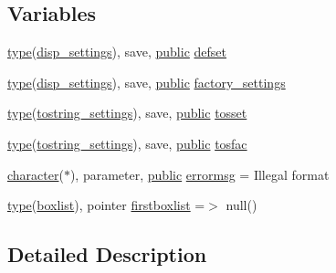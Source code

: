 \subsection*{Variables}
\begin{DoxyCompactItemize}
\item 
\hyperlink{stop__watch_83_8txt_a70f0ead91c32e25323c03265aa302c1c}{type}(\hyperlink{structm__display__util_1_1disp__settings}{disp\+\_\+settings}), save, \hyperlink{M__stopwatch_83_8txt_a2f74811300c361e53b430611a7d1769f}{public} \hyperlink{namespacem__display__util_a94e5894dfc5e8a59b6ceac6721ae4f8e}{defset}
\item 
\hyperlink{stop__watch_83_8txt_a70f0ead91c32e25323c03265aa302c1c}{type}(\hyperlink{structm__display__util_1_1disp__settings}{disp\+\_\+settings}), save, \hyperlink{M__stopwatch_83_8txt_a2f74811300c361e53b430611a7d1769f}{public} \hyperlink{namespacem__display__util_a9ce4a22503d46c3cf4d1a054812827c0}{factory\+\_\+settings}
\item 
\hyperlink{stop__watch_83_8txt_a70f0ead91c32e25323c03265aa302c1c}{type}(\hyperlink{structm__display__util_1_1tostring__settings}{tostring\+\_\+settings}), save, \hyperlink{M__stopwatch_83_8txt_a2f74811300c361e53b430611a7d1769f}{public} \hyperlink{namespacem__display__util_a5c904147cafd4110a901207d859bdf7b}{tosset}
\item 
\hyperlink{stop__watch_83_8txt_a70f0ead91c32e25323c03265aa302c1c}{type}(\hyperlink{structm__display__util_1_1tostring__settings}{tostring\+\_\+settings}), save, \hyperlink{M__stopwatch_83_8txt_a2f74811300c361e53b430611a7d1769f}{public} \hyperlink{namespacem__display__util_a0bd80d23e6e5fec3979a3357f65fb5e3}{tosfac}
\item 
\hyperlink{option__stopwatch_83_8txt_abd4b21fbbd175834027b5224bfe97e66}{character}($\ast$), parameter, \hyperlink{M__stopwatch_83_8txt_a2f74811300c361e53b430611a7d1769f}{public} \hyperlink{namespacem__display__util_a844bf51463bbf006c07c60eb75a44051}{errormsg} = \textquotesingle{}Illegal format\textquotesingle{}
\item 
\hyperlink{stop__watch_83_8txt_a70f0ead91c32e25323c03265aa302c1c}{type}(\hyperlink{structm__display__util_1_1boxlist}{boxlist}), pointer \hyperlink{namespacem__display__util_af285f44a47c745fc4da9df4a73269ac2}{firstboxlist} =$>$ null()
\end{DoxyCompactItemize}


\subsection{Detailed Description}
